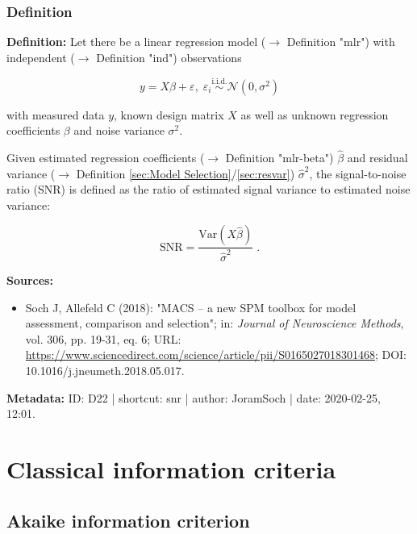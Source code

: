 \documentclass[a4paper,12pt]{book}
\begin{document}
\subsubsection[\textit{Definition}]{Definition} \label{sec:snr}

\vspace{1em}
\textbf{Definition:} Let there be a linear regression model ($\rightarrow$ Definition "mlr") with independent ($\rightarrow$ Definition "ind") observations

\begin{equation} \label{eq:snr-mlr}
y = X\beta + \varepsilon, \; \varepsilon_i \overset{\mathrm{i.i.d.}}{\sim} \mathcal{N}(0, \sigma^2)
\end{equation}

with measured data $y$, known design matrix $X$ as well as unknown regression coefficients $\beta$ and noise variance $\sigma^2$.

Given estimated regression coefficients ($\rightarrow$ Definition "mlr-beta") $\hat{\beta}$ and residual variance ($\rightarrow$ Definition \ref{sec:Model Selection}/\ref{sec:resvar}) $\hat{\sigma}^2$, the signal-to-noise ratio (SNR) is defined as the ratio of estimated signal variance to estimated noise variance:

\begin{equation} \label{eq:snr-SNR}
\mathrm{SNR} = \frac{\mathrm{Var}(X\hat{\beta})}{\hat{\sigma}^2} \; .
\end{equation}

\vspace{1em}
\textbf{Sources:}
\begin{itemize}
\item Soch J, Allefeld C (2018): "MACS – a new SPM toolbox for model assessment, comparison and selection"; in: \textit{Journal of Neuroscience Methods}, vol. 306, pp. 19-31, eq. 6; URL: \url{https://www.sciencedirect.com/science/article/pii/S0165027018301468}; DOI: 10.1016/j.jneumeth.2018.05.017.
\end{itemize}


\vspace{1em}
\textbf{Metadata:} ID: D22 | shortcut: snr | author: JoramSoch | date: 2020-02-25, 12:01.


\pagebreak
\section{Classical information criteria}

\subsection{Akaike information criterion}
\end{document}

